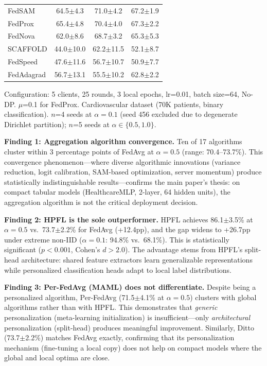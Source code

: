 \documentclass[conference]{IEEEtran}
\begin{document}
\begin{table}[htbp]
\begin{tabular}{lccc}
FedSAM                   & 64.5$\pm$4.3 & 71.0$\pm$4.2 & 67.2$\pm$1.9 \\
FedProx                  & 65.4$\pm$4.8 & 70.4$\pm$4.0 & 67.3$\pm$2.2 \\
FedNova                  & 62.0$\pm$8.6 & 68.7$\pm$3.2 & 65.3$\pm$5.3 \\
\midrule
SCAFFOLD                 & 44.0$\pm$10.0 & 62.2$\pm$11.5 & 52.1$\pm$8.7 \\
FedSpeed                 & 47.6$\pm$11.6 & 56.7$\pm$10.7 & 50.9$\pm$7.7 \\
FedAdagrad               & 56.7$\pm$13.1 & 55.5$\pm$10.2 & 62.8$\pm$2.2 \\
\bottomrule
\end{tabular}

\vspace{1mm}
\footnotesize{Configuration: 5 clients, 25 rounds, 3 local epochs, lr=0.01, batch size=64, No-DP. $\mu$=0.1 for FedProx. Cardiovascular dataset (70K patients, binary classification). $n$=4 seeds at $\alpha{=}0.1$ (seed 456 excluded due to degenerate Dirichlet partition); $n$=5 seeds at $\alpha \in \{0.5, 1.0\}$.}
\end{table}

\noindent\textbf{Finding 1: Aggregation algorithm convergence.} Ten of 17 algorithms cluster within 3 percentage points of FedAvg at $\alpha{=}0.5$ (range: 70.4--73.7\%). This convergence phenomenon---where diverse algorithmic innovations (variance reduction, logit calibration, SAM-based optimization, server momentum) produce statistically indistinguishable results---confirms the main paper's thesis: on compact tabular models (HealthcareMLP, 2-layer, 64 hidden units), the aggregation algorithm is not the critical deployment decision.

\noindent\textbf{Finding 2: HPFL is the sole outperformer.} HPFL achieves 86.1$\pm$3.5\% at $\alpha{=}0.5$ vs.\ 73.7$\pm$2.2\% for FedAvg (+12.4pp), and the gap widens to +26.7pp under extreme non-IID ($\alpha{=}0.1$: 94.8\% vs.\ 68.1\%). This is statistically significant ($p{<}0.001$, Cohen's $d{>}2.0$). The advantage stems from HPFL's split-head architecture: shared feature extractors learn generalizable representations while personalized classification heads adapt to local label distributions.

\noindent\textbf{Finding 3: Per-FedAvg (MAML) does not differentiate.} Despite being a personalized algorithm, Per-FedAvg (71.5$\pm$4.1\% at $\alpha{=}0.5$) clusters with global algorithms rather than with HPFL. This demonstrates that \textit{generic} personalization (meta-learning initialization) is insufficient---only \textit{architectural} personalization (split-head) produces meaningful improvement. Similarly, Ditto (73.7$\pm$2.2\%) matches FedAvg exactly, confirming that its personalization mechanism (fine-tuning a local copy) does not help on compact models where the global and local optima are close.
\end{document}
